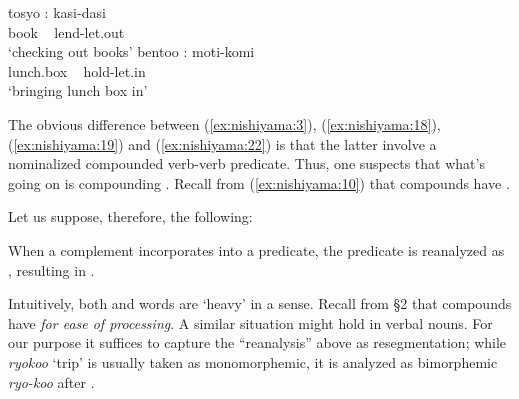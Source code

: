 \documentclass[output=paper]{LSP/langsci}
\begin{document}
\ea\label{ex:nishiyama:22}
 \ea
 \gll tosyo : kasi-dasi\\
    book ~ lend-let.out\\
\glt ‘checking out books’
  \ex
  \gll bentoo  : moti-komi\\
    lunch.box  ~ hold-let.in\\
\glt ‘bringing lunch box in’    \citep[229]{Kageyama1993}
\z
\z

The obvious difference between (\ref{ex:nishiyama:3}), (\ref{ex:nishiyama:18}), (\ref{ex:nishiyama:19}) and (\ref{ex:nishiyama:22}) is that the latter involve a nominalized compounded verb-verb predicate. Thus, one suspects that what's going on is  compounding . Recall from (\ref{ex:nishiyama:10}) that  compounds have .

Let us suppose, therefore, the following:

\ea\label{ex:nishiyama:23}
 When a complement incorporates into a  predicate, the predicate is reanalyzed as , resulting in .
\z

Intuitively, both  and  words are ‘heavy’ in a sense. Recall from §2 that  compounds have  \textit{for ease of processing}. A similar situation might hold in  verbal nouns. For our purpose it suffices to capture the “reanalysis” above as resegmentation; while \textit{ryokoo} ‘trip’ is usually taken as monomorphemic, it is analyzed as bimorphemic \textit{ryo-koo} after .
\end{document}
